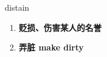 
\begin{frame}
{\huge distain}
\begin{center}
\begin{enumerate}\Large
  \item \textbf{贬损、伤害某人的名誉}
  \item \textbf{弄脏 make dirty}
\end{enumerate}
\end{center}
\end{frame}
